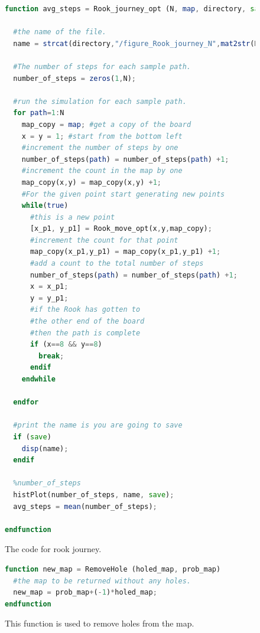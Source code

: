 \documentclass{amsart}
\numberwithin{equation}{section}
\begin{document}
\begin{figure}[!h]
    \centering
    \begin{lstlisting}[language=octave]
function avg_steps = Rook_journey_opt (N, map, directory, save)
  
  #the name of the file.
  name = strcat(directory,"/figure_Rook_journey_N",mat2str(N),".png");
  
  #The number of steps for each sample path.
  number_of_steps = zeros(1,N);
  
  #run the simulation for each sample path.
  for path=1:N
    map_copy = map; #get a copy of the board
    x = y = 1; #start from the bottom left
    #increment the number of steps by one
    number_of_steps(path) = number_of_steps(path) +1;
    #increment the count in the map by one
    map_copy(x,y) = map_copy(x,y) +1;
    #For the given point start generating new points
    while(true)
      #this is a new point
      [x_p1, y_p1] = Rook_move_opt(x,y,map_copy);
      #increment the count for that point
      map_copy(x_p1,y_p1) = map_copy(x_p1,y_p1) +1;
      #add a count to the total number of steps
      number_of_steps(path) = number_of_steps(path) +1;
      x = x_p1;
      y = y_p1;
      #if the Rook has gotten to
      #the other end of the board
      #then the path is complete
      if (x==8 && y==8)
        break;
      endif
    endwhile
    
  endfor
  
  #print the name is you are going to save
  if (save)
    disp(name);
  endif
  
  %number_of_steps
  histPlot(number_of_steps, name, save);
  avg_steps = mean(number_of_steps);
  
endfunction
    \end{lstlisting}
    \caption{The code for rook journey.}
    \label{code:rook_journey}
\end{figure}

\begin{figure}[!h]
    \centering
    \begin{lstlisting}[language=octave]
function new_map = RemoveHole (holed_map, prob_map)
  #the map to be returned without any holes.
  new_map = prob_map+(-1)*holed_map;
endfunction
    \end{lstlisting}
    \caption{This function is used to remove holes from the map.}
    \label{code:remove_hole}
\end{figure}
\end{document}
